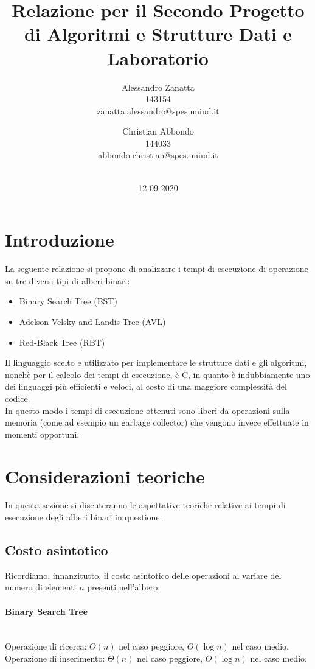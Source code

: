 \documentclass{article}
\title{Relazione per il Secondo Progetto di Algoritmi e Strutture Dati e Laboratorio}
\date{12-09-2020}
\author{Alessandro Zanatta \\ 143154 \\ zanatta.alessandro@spes.uniud.it\\ \and Christian Abbondo \\ 144033 \\ abbondo.christian@spes.uniud.it\\ \\}
\begin{document}
	
	\maketitle
	\newpage
	
	
	\tableofcontents	
	\newpage
	
	\section{Introduzione}
	La seguente relazione si propone di analizzare i tempi di esecuzione di operazione su tre diversi tipi di alberi binari: 
	\begin{itemize}
		\item Binary Search Tree (BST)
		\item Adelson-Velsky and Landis Tree (AVL)
		\item Red-Black Tree (RBT)
	\end{itemize}
	 
	Il linguaggio scelto e utilizzato per implementare le strutture dati e gli algoritmi, nonchè per il calcolo dei tempi di esecuzione, è C, in quanto è indubbiamente uno dei linguaggi più efficienti e veloci, al costo di una maggiore complessità del codice. \\ In questo modo i tempi di esecuzione ottenuti sono liberi da operazioni sulla memoria (come ad esempio un garbage collector) che vengono invece effettuate in momenti opportuni.
	\newpage
	
	
	\section{Considerazioni teoriche}
	In questa sezione si discuteranno le aspettative teoriche relative ai tempi di esecuzione degli alberi binari in questione.
	
	\subsection{Costo asintotico}
	Ricordiamo, innanzitutto, il costo asintotico delle operazioni al variare del numero di elementi $n$ presenti nell'albero:
	
	\paragraph{Binary Search Tree}\mbox{}\\
	Operazione di ricerca: $\Theta\left(n\right)$ nel caso peggiore, $O\left(\log{n}\right)$ nel caso medio.\\
	Operazione di inserimento: $\Theta\left(n\right)$ nel caso peggiore, $O\left(\log{n}\right)$ nel caso medio. \\
	
\end{document}
